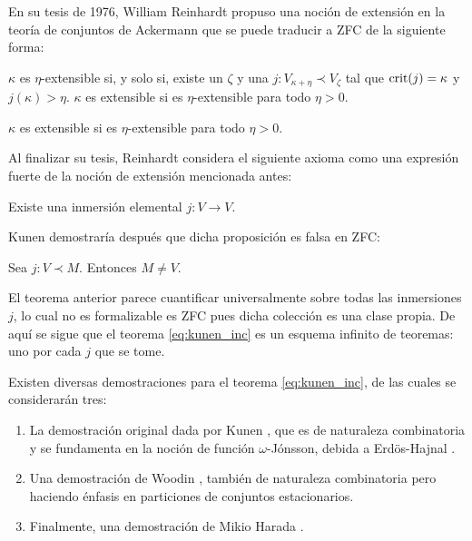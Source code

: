 \documentclass[12pt]{article}
\begin{document}
    En su tesis de 1976, William Reinhardt \cite{reinhardt_ackermanns_1970} propuso una noción de extensión en
    la teoría de conjuntos de Ackermann \cite{ackermann_zur_1956} que se puede traducir a ZFC de la siguiente forma:
    \begin{defi}
        $\kappa$ es $\eta$-extensible si, y solo si, existe un $\zeta$ y una $j\colon V_{\kappa+\eta}\prec V_\zeta$
        tal que $\mathrm { crit } ( j ) = \kappa$ y $j(\kappa) > \eta$.
        $\kappa$ es extensible si es $\eta$-extensible para todo $\eta>0$.
    \end{defi}
    \begin{defi}
        $\kappa$ es extensible si es $\eta$-extensible para todo $\eta>0$.
    \end{defi}


    Al finalizar su tesis, Reinhardt considera el siguiente axioma como una expresión fuerte
    de la noción de extensión mencionada antes:
    \begin{prop}
        Existe una inmersión elemental $j\colon V\to V$.
    \end{prop}

    Kunen \cite{kunen_elementary_1971} demostraría después que dicha proposición es falsa
    en ZFC:
    \begin{teo}
        Sea $j\colon V\prec M$. Entonces $M\neq V$.
    \end{teo}

    El teorema anterior parece cuantificar universalmente sobre todas las inmersiones $j$,
    lo cual no es formalizable es ZFC pues dicha colección es una clase propia. De aquí se sigue
    que el teorema \ref{eq:kunen_inc} es un esquema infinito de teoremas: uno por cada $j$ que se tome.

    Existen diversas demostraciones para el teorema \ref{eq:kunen_inc}, de las cuales se considerarán tres:
    \begin{enumerate}
        \item La demostración original dada por Kunen \cite{kunen_elementary_1971}, que
              es de naturaleza combinatoria y se fundamenta en la noción de función
              $\omega$-Jónsson, debida a Erdös-Hajnal \cite{erdos_problem_1966}.
        \item Una demostración de Woodin \cite[Pág 320]{kanamori_higher_2009}, también de naturaleza combinatoria
              pero haciendo énfasis en particiones de conjuntos estacionarios.
        \item Finalmente, una demostración de Mikio Harada \cite[Pág 321]{kanamori_higher_2009}.
    \end{enumerate}
\end{document}
